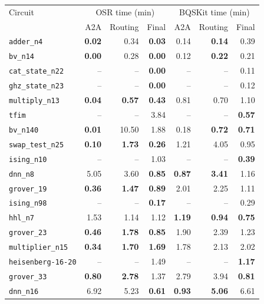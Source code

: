 \begin{table}[p]
\centering
\scriptsize
\begin{tabular}{l|rrr|rrr}
\hline
Circuit & \multicolumn{3}{c|}{OSR time (min)} & \multicolumn{3}{c}{BQSKit time (min)} \\
 & A2A & Routing & Final & A2A & Routing & Final \\
\hline
\texttt{adder\_n4} & \textbf{0.02} & 0.34 & \textbf{0.03} & 0.14 & \textbf{0.14} & 0.39 \\
\texttt{bv\_n14} & \textbf{0.00} & 0.28 & \textbf{0.00} & 0.12 & \textbf{0.22} & 0.21 \\
\texttt{cat\_state\_n22} & -- & -- & \textbf{0.00} & -- & -- & 0.11 \\
\texttt{ghz\_state\_n23} & -- & -- & \textbf{0.00} & -- & -- & 0.12 \\
\texttt{multiply\_n13} & \textbf{0.04} & \textbf{0.57} & \textbf{0.43} & 0.81 & 0.70 & 1.10 \\
\texttt{tfim} & -- & -- & 3.84 & -- & -- & \textbf{0.57} \\
\texttt{bv\_n140} & \textbf{0.01} & 10.50 & 1.88 & 0.18 & \textbf{0.72} & \textbf{0.71} \\
\texttt{swap\_test\_n25} & \textbf{0.10} & \textbf{1.73} & \textbf{0.26} & 1.21 & 4.05 & 0.95 \\
\texttt{ising\_n10} & -- & -- & 1.03 & -- & -- & \textbf{0.39} \\
\texttt{dnn\_n8} & 5.05 & 3.60 & \textbf{0.85} & \textbf{0.87} & \textbf{3.41} & 1.16 \\
\texttt{grover\_19} & \textbf{0.36} & \textbf{1.47} & \textbf{0.89} & 2.01 & 2.25 & 1.11 \\
\texttt{ising\_n98} & -- & -- & \textbf{0.17} & -- & -- & 0.29 \\
\texttt{hhl\_n7} & 1.53 & 1.14 & 1.12 & \textbf{1.19} & \textbf{0.94} & \textbf{0.75} \\
\texttt{grover\_23} & \textbf{0.46} & \textbf{1.78} & \textbf{0.85} & 1.90 & 2.39 & 1.23 \\
\texttt{multiplier\_n15} & \textbf{0.34} & \textbf{1.70} & \textbf{1.69} & 1.78 & 2.13 & 2.02 \\
\texttt{heisenberg-16-20} & -- & -- & 1.49 & -- & -- & \textbf{1.17} \\
\texttt{grover\_33} & \textbf{0.80} & \textbf{2.78} & 1.37 & 2.79 & 3.94 & \textbf{0.81} \\
\texttt{dnn\_n16} & 6.92 & 5.23 & \textbf{0.61} & \textbf{0.93} & \textbf{5.06} & 6.61 \\

\end{tabular}
\end{table}
